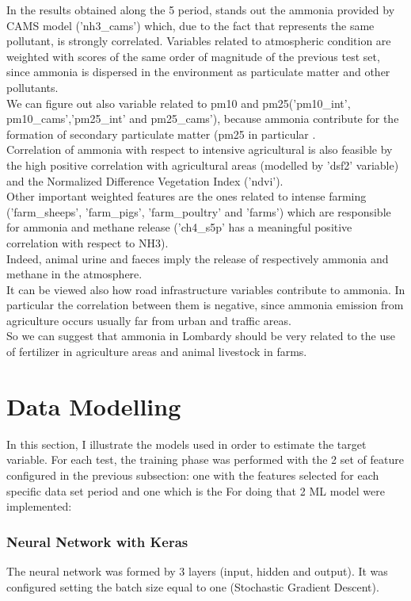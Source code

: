 In the results obtained along the 5 period, stands out the ammonia provided by CAMS model ('nh3\_cams') which, due to the fact that represents the same pollutant, is strongly correlated. Variables related to atmospheric condition are weighted with scores of the same order of magnitude of the previous test set, since ammonia is dispersed in the environment as particulate matter and other pollutants.\\
We can figure out also variable related to pm10 and pm25('pm10\_int', pm10\_cams','pm25\_int' and pm25\_cams'), because ammonia contribute for the formation of secondary particulate matter (pm25 in particular\cite{zhu2015sources} .\\
Correlation of ammonia with respect to intensive agricultural is also feasible by the high positive correlation with agricultural areas (modelled by 'dsf2' variable) and the Normalized Difference Vegetation Index ('ndvi').\\
Other important weighted features are the ones related to intense farming ('farm\_sheeps', 'farm\_pigs', 'farm\_poultry' and 'farms') which are responsible for ammonia and methane release ('ch4\_s5p' has a meaningful positive correlation with respect to NH3).\\
Indeed, animal urine and faeces imply the release of respectively ammonia and methane in the atmosphere\cite{saggar2004review}.\\
It can be viewed also how road infrastructure variables contribute to ammonia. In particular the correlation between them is negative, since ammonia emission from agriculture occurs usually far from urban and traffic areas.\\
So we can suggest that ammonia in Lombardy should be very related to the use of fertilizer in agriculture areas and animal livestock in farms.
 




\section{Data Modelling}
In this section, I illustrate the models used in order to estimate the target variable. For each test, the training phase was performed with the 2 set of feature configured in the previous subsection: one with the features selected for each specific data set period and one which is the
For doing that 2 ML model were implemented:

\subsubsection{Neural Network with Keras}
The neural network was formed by 3 layers (input, hidden and output). It was configured setting the batch size equal to one (Stochastic Gradient Descent).

